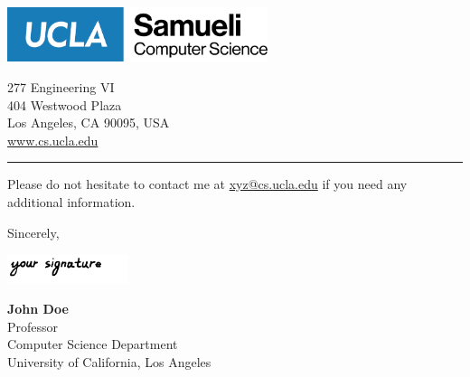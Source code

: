 \documentclass[12pt, a4paper, hidelinks]{letter} %
\begin{document}
\begin{minipage}{0.6\textwidth}
\vspace{-17mm}
\includegraphics[width=3in]{asset/UCLA_CS.png}\\
\end{minipage}
\hfill
\begin{minipage}{0.3\textwidth}\raggedright
\vspace{-20mm}
\footnotesize{
277 Engineering VI\\
404 Westwood Plaza\\
Los Angeles, CA 90095, USA \\
\url{www.cs.ucla.edu}}
\end{minipage}
\hrule
\vspace{3mm}
\rightline{\today}





Please do not hesitate to contact me at \href{mailto:xyz@cs.ucla.edu}{xyz@cs.ucla.edu} if you need any additional information.

\vspace{+2mm}
Sincerely,


\includegraphics[width=1.4in]{asset/signature.png}

\textbf{John Doe}\\
Professor\\
Computer Science Department \\
University of California, Los Angeles
\end{document}
